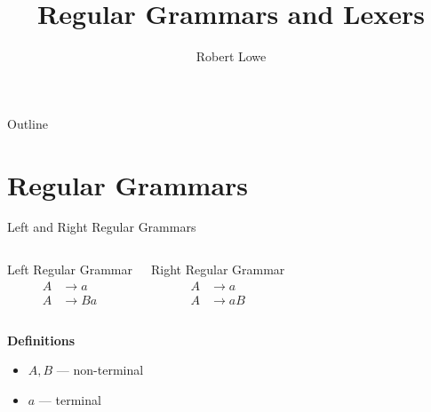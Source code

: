 \documentclass[handout]{beamer}
\title{Regular Grammars and Lexers}
\author{Robert Lowe}
\institute[Southeast Missouri State University] %
{
  Department of Computer Science\\
  Southeast Missouri State University
}
\date[]{}
\begin{document}
\begin{frame}
  \titlepage
\end{frame}

\begin{frame}{Outline}
  \tableofcontents
\end{frame}




\section {Regular Grammars}
\begin{frame}{Left and Right Regular Grammars}
\begin{columns}
\begin{block}{Left Regular Grammar}
    \begin{align*}
        A & \rightarrow a \\
        A & \rightarrow Ba
    \end{align*}
\end{block}

\begin{block}{Right Regular Grammar}
    \begin{align*}
        A & \rightarrow a \\
        A & \rightarrow aB
    \end{align*}
\end{block}

\end{columns}

\vspace{1cm}
{\bf Definitions}
\begin{itemize}
    \item $A,B$ --- non-terminal
    \item $a$ --- terminal
\end{itemize}
\end{frame}
\end{document}

